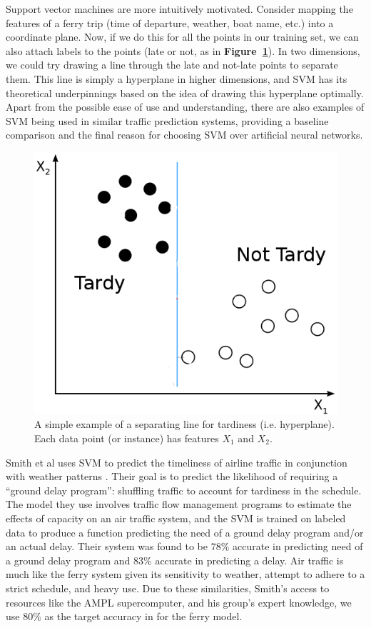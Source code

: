 \documentclass[11pt]{article} %
\begin{document}
Support vector machines are more intuitively motivated. Consider mapping the
features of a ferry trip (time of departure, weather, boat name, etc.) into a
coordinate plane.  Now, if we do this for all the points in our training set,
we can also attach labels to the points (late or not, as in 
\textbf{Figure~\ref{fig:basic_svm_data}}). In two dimensions, we
could try drawing a line through the late and not-late points to separate them.
This line is simply a hyperplane in higher dimensions, and SVM has its theoretical
underpinnings based on the idea of drawing this hyperplane optimally. Apart from
the possible ease of use and understanding, there are also examples of SVM 
being used in similar traffic prediction systems, providing a baseline comparison
and the final reason for choosing SVM over artificial neural networks.

\begin{figure}[h]
  \centering
  \includegraphics[scale=.5]{images/basic_svm_data.png}
  \caption{A simple example of a separating line for tardiness (i.e. hyperplane). 
      Each data point (or instance) has features $X_1$ and $X_2$.}
  \label{fig:basic_svm_data}
\end{figure}

Smith et al uses SVM to predict the timeliness of airline
traffic in conjunction with weather patterns \cite{smith2008decision}. Their goal is 
to predict the likelihood of requiring a ``ground delay program'': shuffling traffic 
to account for tardiness in the schedule. The model they use involves traffic 
flow management programs to estimate the effects of capacity on an air traffic 
system, and the SVM is trained on labeled data to produce a function predicting 
the need of a ground delay program and/or an actual delay. Their system was
found to be $78\%$ accurate in predicting need of a ground delay program and $83\%$ 
accurate in predicting a delay. Air traffic is much like the ferry system given
its sensitivity to weather, attempt to adhere to a strict schedule, and heavy use.
Due to these similarities, Smith's access to resources like the AMPL supercomputer, 
and his group's expert knowledge, we use $80\%$ as the target accuracy in for the
ferry model. 
\end{document}
